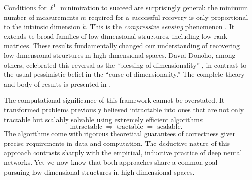 \documentclass[../../book-main.tex]{subfiles}
\begin{document}
Conditions for $\ell^1$ minimization to succeed are surprisingly general: the minimum number of measurements $m$ required for a successful recovery is only proportional to the intrinsic dimension $k$. This is the \textit{compressive sensing} phenomenon \cite{CandesE2006-ICM}. It extends to broad families of low-dimensional structures, including low-rank matrices. These results fundamentally changed our understanding of recovering low-dimensional structures in high-dimensional spaces. David Donoho, among others, celebrated this reversal as the ``blessing of dimensionality'' \cite{DonohoD2000}, in contrast to the usual pessimistic belief in the ``curse of dimensionality.'' The complete theory and body of results is presented in \cite{Wright-Ma-2022}.

The computational significance of this framework cannot be overstated. It transformed problems previously believed intractable into ones that are not only tractable but scalably solvable using extremely efficient algorithms:
\begin{equation}
    \text{intractable} \;\Longrightarrow\; \text{tractable} \;\Longrightarrow\; \text{scalable}.
\end{equation}
The algorithms come with rigorous theoretical guarantees of correctness given precise requirements in data and computation. The deductive nature of this approach contrasts sharply with the empirical, inductive practice of deep neural networks. Yet we now know that both approaches share a common goal---pursuing low-dimensional structures in high-dimensional spaces.
\end{document}
